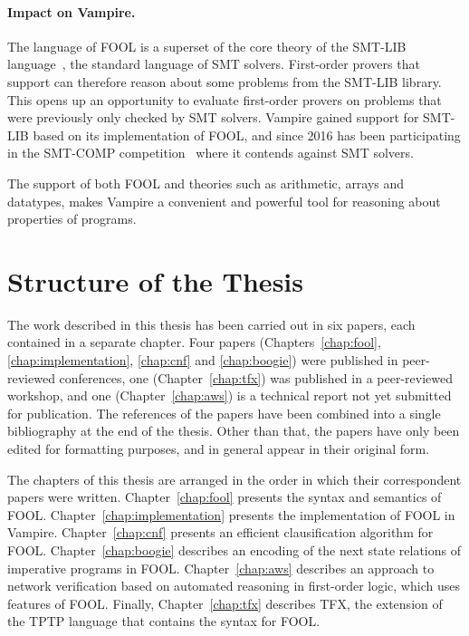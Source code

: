 \paragraph{Impact on Vampire.}
The language of FOOL is a superset of the core theory of the SMT-LIB language~\cite{SMT-LIB}, the standard language of SMT solvers. First-order provers that support \folb{} can therefore reason about some problems from the SMT-LIB library. This opens up an opportunity to evaluate first-order provers on problems that were previously only checked by SMT solvers. Vampire gained support for SMT-LIB based on its implementation of FOOL, and since 2016 has been participating in the SMT-COMP competition~\cite{DBLP:conf/cav/BarrettMS05} where it contends against SMT solvers.

The support of both FOOL and theories such as arithmetic, arrays and datatypes, makes Vampire a convenient and powerful tool for reasoning about properties of programs.


\section*{Structure of the Thesis}
\label{sect:intro:overview}

The work described in this thesis has been carried out in six papers, each contained in a separate chapter. Four papers (Chapters~\ref{chap:fool}, \ref{chap:implementation}, \ref{chap:cnf} and \ref{chap:boogie}) were published in peer-reviewed conferences, one (Chapter~\ref{chap:tfx}) was published in a peer-reviewed workshop, and one (Chapter~\ref{chap:aws}) is a technical report not yet submitted for publication. The references of the papers have been combined into a single bibliography at the end of the thesis. Other than that, the papers have only been edited for formatting purposes, and in general appear in their original form.

The chapters of this thesis are arranged in the order in which their correspondent papers were written. Chapter~\ref{chap:fool} presents the syntax and semantics of FOOL. Chapter~\ref{chap:implementation} presents the implementation of FOOL in Vampire. Chapter~\ref{chap:cnf} presents an efficient clausification algorithm for FOOL. Chapter~\ref{chap:boogie} describes an encoding of the next state relations of imperative programs in FOOL. Chapter~\ref{chap:aws} describes an approach to network verification based on automated reasoning in first-order logic, which uses features of FOOL. Finally, Chapter~\ref{chap:tfx} describes TFX, the extension of the TPTP language that contains the syntax for FOOL.


